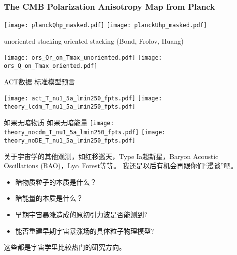 \documentclass[CJK]{beamer}
\begin{document}
\begin{frame}
  \frametitle{The CMB Polarization Anisotropy Map from Planck}
  \texttt{[image: planckQhp\_masked.pdf]}
  \texttt{[image: planckUhp\_masked.pdf]}  

  {\hskip 0.2in} {\scriptsize unoriented stacking}     {\hskip 0.65in} {\scriptsize oriented stacking (Bond, Frolov, Huang)}
  
  \texttt{[image: ors\_Qr\_on\_Tmax\_unoriented.pdf]}
  \texttt{[image: ors\_Q\_on\_Tmax\_oriented.pdf]}  
  
\end{frame}


\begin{frame}
\bch
\hskip 0.2in ACT数据 \hskip 0.6in   标准模型预言

\texttt{[image: act\_T\_nu1\_5a\_lmin250\_fpts.pdf]}
\texttt{[image: theory\_lcdm\_T\_nu1\_5a\_lmin250\_fpts.pdf]}

如果无暗物质 \hskip 0.5in 如果无暗能量
\texttt{[image: theory\_nocdm\_T\_nu1\_5a\_lmin250\_fpts.pdf]}
\texttt{[image: theory\_noDE\_T\_nu1\_5a\_lmin250\_fpts.pdf]}

\ech
\end{frame}

\begin{frame}
\bch
关于宇宙学的其他观测，如红移巡天，Type Ia超新星，Baryon Acoustic Oscillations (BAO)，Ly$\alpha$ Forest等等。
我还是以后有机会再跟你们“漫谈”吧。
\ech
\end{frame}

\begin{frame}
\bch
\begin{itemize}
\item{暗物质粒子的本质是什么？}
\item{暗能量的本质是什么？}
\item{早期宇宙暴涨造成的原初引力波是否能测到?}
\item{能否重建早期宇宙暴涨场的具体粒子物理模型?}
\end{itemize}

这些都是宇宙学里比较热门的研究方向。


\ech
\end{frame}
\end{document}
